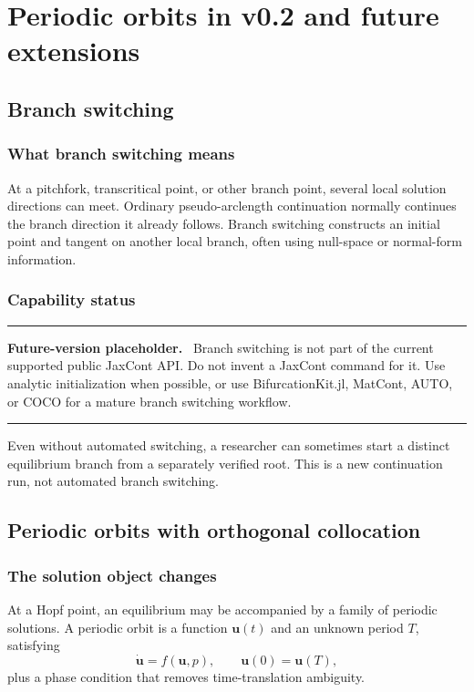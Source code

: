 \documentclass[11pt,oneside]{book}
\newcommand{\state}{\bm{u}}
\newenvironment{futurebox}
  {\par\medskip\noindent\begin{minipage}{\textwidth}
   \color{black!55}\rule{\textwidth}{0.8pt}\par
   \textbf{Future-version placeholder.}\ \color{black}}
  {\par\color{black!55}\rule{\textwidth}{0.8pt}
   \end{minipage}\par\medskip}
\begin{document}
\part{Periodic orbits in v0.2 and future extensions}

\chapter{Branch switching}

\section{What branch switching means}

At a pitchfork, transcritical point, or other branch point, several local
solution directions can meet. Ordinary pseudo-arclength continuation normally
continues the branch direction it already follows. Branch switching constructs
an initial point and tangent on another local branch, often using null-space or
normal-form information.

\section{Capability status}

\begin{futurebox}
Branch switching is not part of the current supported public JaxCont API.
Do not invent a JaxCont command for it. Use analytic initialization when
possible, or use BifurcationKit.jl, MatCont, AUTO, or COCO for a mature branch
switching workflow.
\end{futurebox}

Even without automated switching, a researcher can sometimes start a distinct
equilibrium branch from a separately verified root. This is a new continuation
run, not automated branch switching.

\chapter{Periodic orbits with orthogonal collocation}

\section{The solution object changes}

At a Hopf point, an equilibrium may be accompanied by a family of periodic
solutions. A periodic orbit is a function $\state(t)$ and an unknown period
$T$, satisfying
\[
  \dot{\state}=f(\state,p),\qquad
  \state(0)=\state(T),
\]
plus a phase condition that removes time-translation ambiguity.
\end{document}
